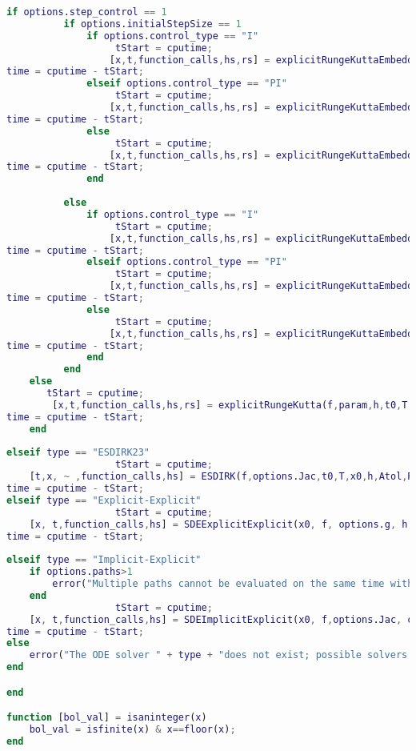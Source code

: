 \begin{lstlisting}[language=Matlab,caption=ODEsolver wrapper,label=lst0:wrapper]
    if options.step_control == 1 
          if options.initialStepSize == 1
              if options.control_type == "I"
                   tStart = cputime;
                  [x,t,function_calls,hs,rs] = explicitRungeKuttaEmbedded(f,param,h,t0,T,x0,A,b,bhat,c,Atol,Rtol,hmin,hmax,eps_tol,p,true); % DOPRI54 with everything
time = cputime - tStart;
              elseif options.control_type == "PI"
                   tStart = cputime;
                  [x,t,function_calls,hs,rs] = explicitRungeKuttaEmbeddedPI(f,param,h,t0,T,x0,A,b,bhat,c,Atol,Rtol,hmin,hmax,eps_tol,p,true); % DOPRI54 with everything
time = cputime - tStart;
              else
                   tStart = cputime;
                  [x,t,function_calls,hs,rs] = explicitRungeKuttaEmbeddedPID(f,param,h,t0,T,x0,A,b,bhat,c,Atol,Rtol,hmin,hmax,eps_tol,p,true); % DOPRI54 with everything
time = cputime - tStart;
              end
                
          else
              if options.control_type == "I"
                   tStart = cputime;
                  [x,t,function_calls,hs,rs] = explicitRungeKuttaEmbedded(f,param,h,t0,T,x0,A,b,bhat,c,Atol,Rtol,hmin,hmax,eps_tol,p,false); % DOPRI54 with everything
time = cputime - tStart;
              elseif options.control_type == "PI"
                   tStart = cputime;
                  [x,t,function_calls,hs,rs] = explicitRungeKuttaEmbeddedPI(f,param,h,t0,T,x0,A,b,bhat,c,Atol,Rtol,hmin,hmax,eps_tol,p,false); % DOPRI54 with everything
time = cputime - tStart;
              else
                   tStart = cputime;
                  [x,t,function_calls,hs,rs] = explicitRungeKuttaEmbeddedPID(f,param,h,t0,T,x0,A,b,bhat,c,Atol,Rtol,hmin,hmax,eps_tol,p,false); % DOPRI54 with everything
time = cputime - tStart;
              end
          end
    else
       tStart = cputime;
        [x,t,function_calls,hs,rs] = explicitRungeKutta(f,param,h,t0,T,x0,A,b,c); % Standard euler
time = cputime - tStart;
    end
    
elseif type == "ESDIRK23"
                   tStart = cputime;
    [t,x, ~ ,function_calls,hs] = ESDIRK(f,options.Jac,t0,T,x0,h,Atol,Rtol,param);
time = cputime - tStart;
elseif type == "Explicit-Explicit"
                   tStart = cputime;
    [x, t,function_calls,hs] = SDEExplicitExplicit(x0, f, options.g, h, t0, T, param, options.paths,seed);
time = cputime - tStart;
    
elseif type == "Implicit-Explicit"
    if options.paths>1
        error("Multiple paths cannot be evaluated on the same time with the Implicit-Explicit SDE solver. Use Explicit-Explicit or setup an extern loop.")
    end
                   tStart = cputime;
    [x, t,function_calls,hs] = SDEImplicitExplicit(x0, f,options.Jac, options.g, h, t0, T, param, options.paths, newtonTolerance, newtonMaxiterations,seed);
time = cputime - tStart;
else
    error("The ODE solver " + type + "does not exist; possible solvers are Explicit Euler, Implicit Euler, RK4, DOPRI54, ESDIRK23, Explicit-Explicit and Implicit-Explicit")
end

end

function [bol_val] = isaninteger(x)
    bol_val = isfinite(x) & x==floor(x);
end
\end{lstlisting}
